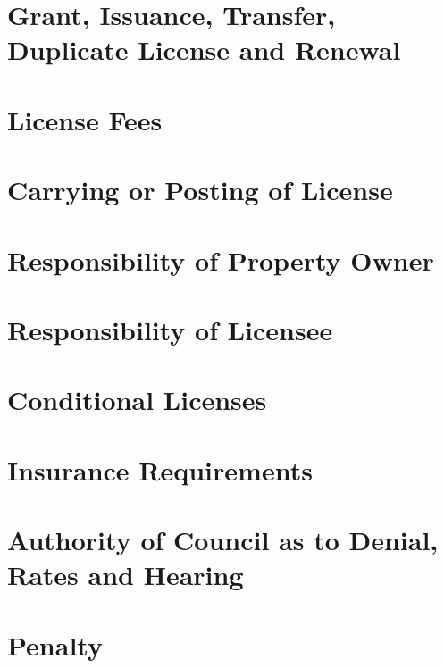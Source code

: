\section{Grant, Issuance, Transfer, Duplicate License and Renewal}


\section{License Fees}


\section{Carrying or Posting of License}


\section{Responsibility of Property Owner}


\section{Responsibility of Licensee}


\section{Conditional Licenses}


\section{Insurance Requirements}


\section{Authority of Council as to Denial, Rates and Hearing}


\setcounter{section}{98}
\section{Penalty}

%
